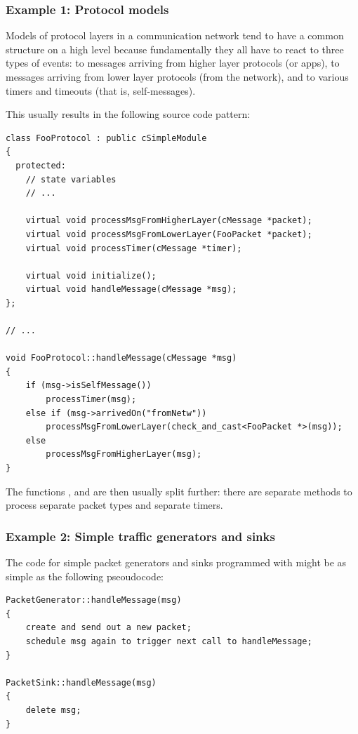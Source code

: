 \subsubsection{Example 1: Protocol models}

Models of protocol layers in a communication network tend to have
a common structure on a high level because fundamentally they all have to react
to three types of events: to messages arriving from higher layer protocols
(or apps), to messages arriving from lower layer protocols (from the network),
and to various timers and timeouts (that is, self-messages).

This usually results in the following source code pattern:

\begin{verbatim}
class FooProtocol : public cSimpleModule
{
  protected:
    // state variables
    // ...

    virtual void processMsgFromHigherLayer(cMessage *packet);
    virtual void processMsgFromLowerLayer(FooPacket *packet);
    virtual void processTimer(cMessage *timer);

    virtual void initialize();
    virtual void handleMessage(cMessage *msg);
};

// ...

void FooProtocol::handleMessage(cMessage *msg)
{
    if (msg->isSelfMessage())
        processTimer(msg);
    else if (msg->arrivedOn("fromNetw"))
        processMsgFromLowerLayer(check_and_cast<FooPacket *>(msg));
    else
        processMsgFromHigherLayer(msg);
}
\end{verbatim}

The functions , 
and  are then usually split further: there are separate
methods to process separate packet types and separate timers.


\subsubsection{Example 2: Simple traffic generators and sinks}


The code for simple packet generators and sinks programmed with  might
be as simple as the following pseoudocode:

\begin{verbatim}
PacketGenerator::handleMessage(msg)
{
    create and send out a new packet;
    schedule msg again to trigger next call to handleMessage;
}

PacketSink::handleMessage(msg)
{
    delete msg;
}
\end{verbatim}

